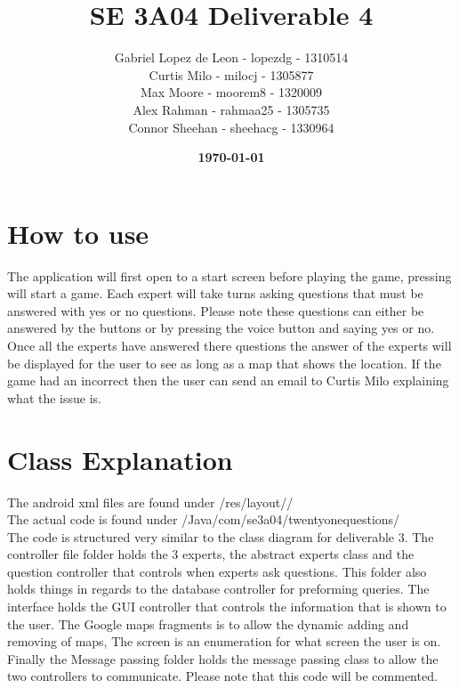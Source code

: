 \documentclass[titlepage]{article}
\title{\textbf{SE 3A04 Deliverable 4}}
\author
{
	Gabriel Lopez de Leon - lopezdg - 1310514\\Curtis Milo - milocj - 1305877\\Max Moore - moorem8 - 1320009\\Alex Rahman - rahmaa25 - 1305735\\Connor Sheehan - sheehacg - 1330964}
\date{\textbf{\today}}
\begin{document}
\maketitle
\section{How to use}
\large
The application will first open to a start screen before playing the game, pressing will start a game. Each expert will take turns asking questions that must be answered with yes or no questions. Please note these questions can either be answered by the buttons or by pressing the voice button and saying yes or no. Once all the experts have answered there questions the answer of the experts will be displayed for the user to see as long as a map that shows the location. If the game had an incorrect then the user can send an email to Curtis Milo explaining what the issue is.

\section{Class Explanation}
The android xml files are found under /res/layout// \\
The actual code is found under /Java/com/se3a04/twentyonequestions/ \\

The code is structured very similar to the class diagram for deliverable 3. The controller file folder holds the 3 experts, the abstract experts class and the question controller that controls when experts ask questions. This folder also holds things in regards to the database controller for preforming queries. The interface holds the GUI controller that controls the information that is shown to the user. The Google maps fragments is to allow the dynamic adding and removing of maps, The screen is an enumeration for what screen the user is on. Finally the Message passing folder holds the message passing class to allow the two controllers to communicate. Please note that this code will be commented.
\end{document}
